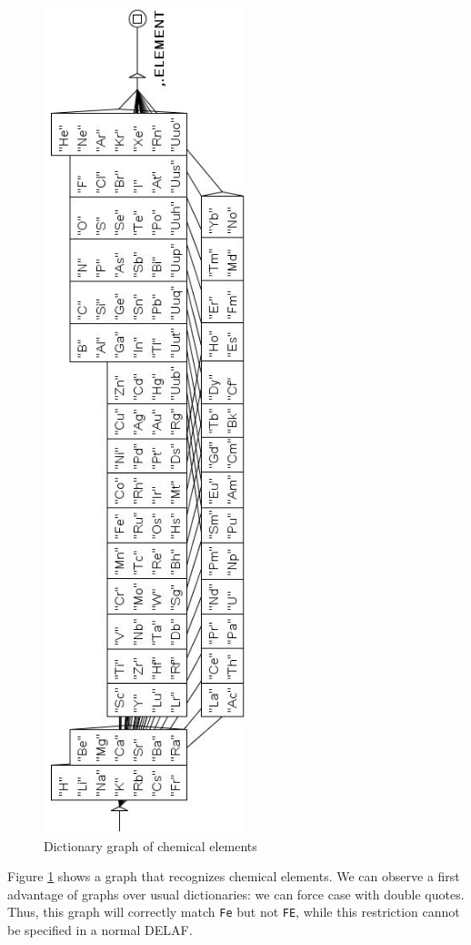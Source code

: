 \begin{figure}[!p]
\begin{center}
\includegraphics[height=24cm]{resources/img/fig3-10.png}
\caption{Dictionary graph of chemical elements\label{elements}}
\end{center}
\end{figure}

\bigskip
\noindent Figure \ref{elements} shows a graph that recognizes chemical
elements. We can observe a first advantage of graphs over usual dictionaries: we can force case
with double quotes. Thus, this graph will
correctly match \verb+Fe+ but not \verb+FE+, while this restriction cannot be specified in a
normal DELAF.

